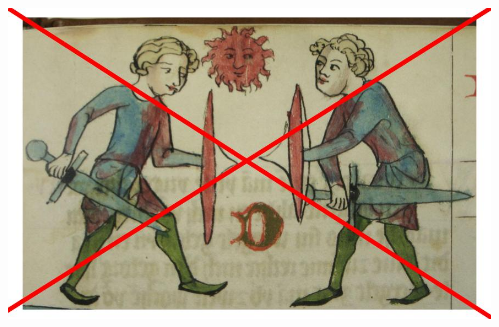 \documentclass[xcolor=dvipsnames]{beamer}%
\begin{document}
\begin{frame}
\begin{columns}
\begin{column}{0.5\textwidth}
		\end{column}
		\begin{column}{0.5\textwidth}
			\begin{center}
				\includegraphics[width=\textwidth,height=0.8\textheight,keepaspectratio]{figure/sad_bozy.jpg}
			\end{center}
		\end{column}
	\end{columns}
\end{frame}
\end{document}
